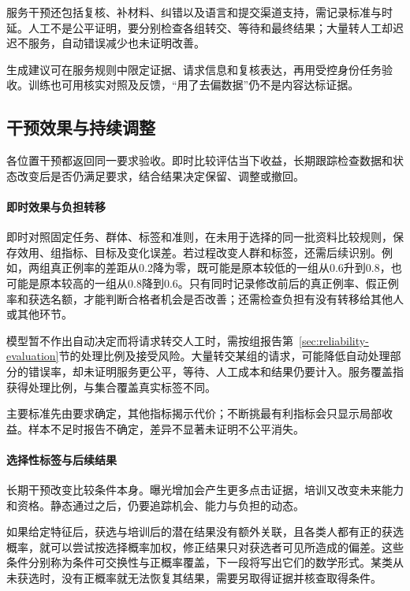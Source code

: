 服务干预还包括复核、补材料、纠错以及语言和提交渠道支持，需记录标准与时延。人工不是公平证明，要分别检查各组转交、等待和最终结果；大量转人工却迟迟不服务，自动错误减少也未证明改善。

生成建议可在服务规则中限定证据、请求信息和复核表达，再用受控身份任务验收。训练也可用核实对照及反馈，“用了去偏数据”仍不是内容达标证据。

\subsection{干预效果与持续调整}
\label{sec:fairness-intervention-evaluation}
\label{sec:fairness-long-term}

各位置干预都返回同一要求验收。即时比较评估当下收益，长期跟踪检查数据和状态改变后是否仍满足要求，结合结果决定保留、调整或撤回。

\paragraph{即时效果与负担转移}

即时对照固定任务、群体、标签和准则，在未用于选择的同一批资料比较规则，保存效用、组指标、目标及变化误差。若过程改变人群和标签，还需后续识别。例如，两组真正例率的差距从0.2降为零，既可能是原本较低的一组从0.6升到0.8，也可能是原本较高的一组从0.8降到0.6。只有同时记录修改前后的真正例率、假正例率和获选名额，才能判断合格者机会是否改善；还需检查负担有没有转移给其他人或其他环节。

模型暂不作出自动决定而将请求转交人工时，需按组报告第~\ref{sec:reliability-evaluation}节的处理比例及接受风险。大量转交某组的请求，可能降低自动处理部分的错误率，却未证明服务更公平，等待、人工成本和结果仍要计入。服务覆盖指获得处理比例，与集合覆盖真实标签不同。

主要标准先由要求确定，其他指标揭示代价；不断挑最有利指标会只显示局部收益。样本不足时报告不确定，差异不显著未证明不公平消失。

\paragraph{选择性标签与后续结果}

长期干预改变比较条件本身。曝光增加会产生更多点击证据，培训又改变未来能力和资格。静态通过之后，仍要追踪机会、能力与负担的动态。

如果给定特征后，获选与培训后的潜在结果没有额外关联，且各类人都有正的获选概率，就可以尝试按选择概率加权，修正结果只对获选者可见所造成的偏差。这些条件分别称为条件可交换性与正概率覆盖，下一段将写出它们的数学形式。某类从未获选时，没有正概率就无法恢复其结果，需要另取得证据并核查取得条件。


